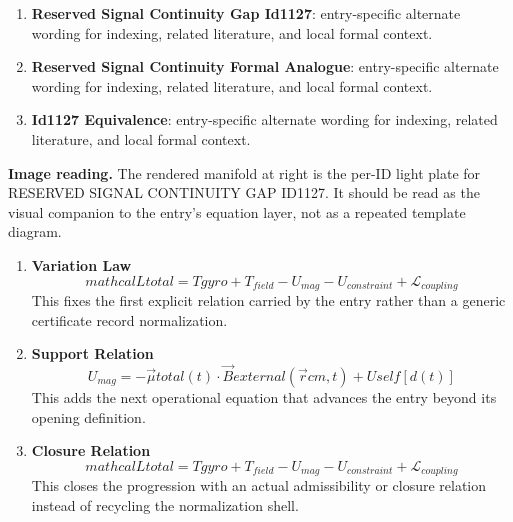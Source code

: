 \begin{enumerate}[leftmargin=1.6em,itemsep=6pt,topsep=4pt]
\item \textbf{Reserved Signal Continuity Gap Id1127}: entry-specific alternate wording for indexing, related literature, and local formal context.
\item \textbf{Reserved Signal Continuity Formal Analogue}: entry-specific alternate wording for indexing, related literature, and local formal context.
\item \textbf{Id1127 Equivalence}: entry-specific alternate wording for indexing, related literature, and local formal context.
\end{enumerate}

\begin{samepage}
\noindent\begin{minipage}[t]{0.45\linewidth}
\vspace{0pt}
\raggedright
\scriptsize\textbf{Image reading.} The rendered manifold at right is the per-ID light plate for RESERVED SIGNAL CONTINUITY GAP ID1127. It should be read as the visual companion to the entry's equation layer, not as a repeated template diagram.\par
\end{minipage}\hfill
\begin{minipage}[t]{0.53\linewidth}
\vspace*{-0.10in}
\raggedright
{}
\end{minipage}
\end{samepage}

\clearpage


\begin{enumerate}[leftmargin=1.6em,itemsep=9pt,topsep=6pt]
\item \textbf{Variation Law}
\[
mathcal{L} {total} = T {gyro} + T_{field} - U_{mag} - U_{constraint} + \mathcal{L}_{coupling}
\]
This fixes the first explicit relation carried by the entry rather than a generic certificate record normalization.

\item \textbf{Support Relation}
\[
U_{mag} = -\vec{\mu} {total}(t) \cdot \vec{B} {external}(\vec{r} {cm}, t) + U {self}[d(t)]
\]
This adds the next operational equation that advances the entry beyond its opening definition.

\item \textbf{Closure Relation}
\[
mathcal{L} {total} = T {gyro} + T_{field} - U_{mag} - U_{constraint} + \mathcal{L}_{coupling}
\]
This closes the progression with an actual admissibility or closure relation instead of recycling the normalization shell.
\end{enumerate}

